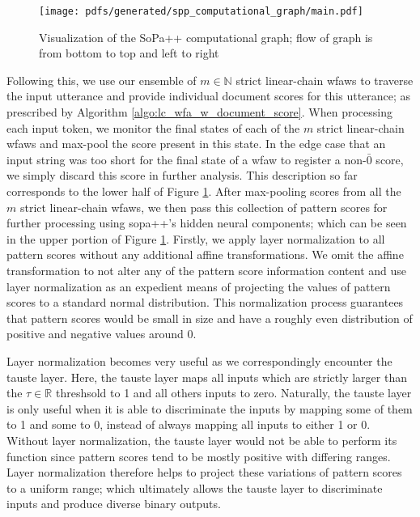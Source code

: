 \begin{figure}[t!]
  \centering
  \texttt{[image: pdfs/generated/spp\_computational\_graph/main.pdf]}
  \caption{Visualization of the SoPa++ computational graph; flow of graph is
    from bottom to top and left to right }
  \label{fig:spp_cg}
\end{figure}

Following this, we use our ensemble of $m \in \mathbb{N}$ strict linear-chain
\ac{wfaws} to traverse the input utterance and provide individual document
scores for this utterance; as prescribed by Algorithm
\ref{algo:lc_wfa_w_document_score}. When processing each input token, we monitor
the final states of each of the $m$ strict linear-chain \ac{wfaws} and
max-pool the score present in this state. In the edge case that an input string
was too short for the final state of a \ac{wfaw} to register a non-$\bar{0}$
score, we simply discard this score in further analysis. This description so far
corresponds to the lower half of Figure \ref{fig:spp_cg}. After max-pooling
scores from all the $m$ strict linear-chain \ac{wfaws}, we then pass this
collection of pattern scores for further processing using \ac{sopa}++'s hidden neural
components; which can be seen in the upper portion of Figure \ref{fig:spp_cg}.
Firstly, we apply layer normalization \citep{ba2016layer} to all pattern scores
without any additional affine transformations. We omit the affine transformation
to not alter any of the pattern score information content and use layer
normalization as an expedient means of projecting the values of pattern scores
to a standard normal distribution. This normalization process guarantees that
pattern scores would be small in size and have a roughly even distribution of
positive and negative values around 0.

Layer normalization becomes very useful as we correspondingly encounter the
\ac{tauste} layer. Here, the \ac{tauste} layer maps all inputs which are strictly larger
than the $\tau \in \mathbb{R}$ threshsold to 1 and all others inputs to zero.
Naturally, the \ac{tauste} layer is only useful when it is able to discriminate the
inputs by mapping some of them to 1 and some to 0, instead of always mapping all
inputs to either 1 or 0. Without layer normalization, the \ac{tauste} layer would not
be able to perform its function since pattern scores tend to be mostly positive
with differing ranges. Layer normalization therefore helps to project these
variations of pattern scores to a uniform range; which ultimately allows the \ac{tauste}
layer to discriminate inputs and produce diverse binary outputs.

